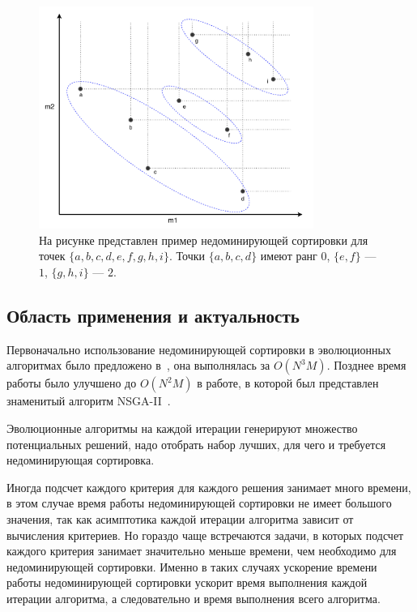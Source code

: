 \begin{figure}[!h]
\begin{center}
\includegraphics[width=0.8\textwidth]{pic/non_dominated_sort.png}
\caption{На рисунке представлен пример недоминирующей сортировки для точек $\{a,b,c,d,e,f,g,h,i\}$.
Точки $\{a,b,c,d\}$ имеют ранг $0$, $\{e,f\}$ {---} $1$, $\{g,h,i\}$ {---} $2$.}
\label{nds}
\end{center}
\end{figure}

\subsection{Область применения и актуальность}

Первоначально использование недоминирующей сортировки в эволюционных алгоритмах было предложено в~\cite{Srinivas}, она выполнялась за $O(N^3M)$. Позднее время работы было улучшено до $O(N^2M)$ в работе, в которой был представлен знаменитый алгоритм NSGA-II~\cite{NSGA-II}.

Эволюционные алгоритмы на каждой итерации генерируют множество потенциальных решений, надо отобрать набор лучших, для чего и требуется недоминирующая сортировка. 

Иногда подсчет каждого критерия для каждого решения занимает много времени, в этом случае время работы недоминирующей сортировки не имеет большого значения, так как асимптотика каждой итерации алгоритма зависит от вычисления критериев. Но гораздо чаще встречаются задачи, в которых подсчет каждого критерия занимает значительно меньше времени, чем необходимо для недоминирующей сортировки. Именно в таких случаях ускорение времени работы недоминирующей сортировки ускорит время выполнения каждой итерации алгоритма, а следовательно и время выполнения всего алгоритма.

